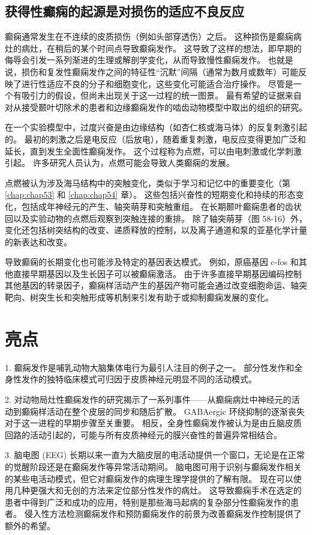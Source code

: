 \subsection{获得性癫痫的起源是对损伤的适应不良反应}
癫痫通常发生在不连续的皮质损伤（例如头部穿透伤）之后。 这种损伤是癫痫病灶的病灶，在稍后的某个时间点导致癫痫发作。 这导致了这样的想法，即早期的侮辱会引发一系列渐进的生理或解剖学变化，从而导致慢性癫痫发作。 也就是说，损伤和复发性癫痫发作之间的特征性“沉默”间隔（通常为数月或数年）可能反映了进行性适应不良的分子和细胞变化，这些变化可能适合治疗操作。 尽管是一个有吸引力的假设，但尚未出现关于这一过程的统一图景。 最有希望的证据来自对从接受颞叶切除术的患者和边缘癫痫发作的啮齿动物模型中取出的组织的研究。

在一个实验模型中，过度兴奋是由边缘结构（如杏仁核或海马体）的反复刺激引起的。 最初的刺激之后是电反应（后放电），随着重复刺激，电反应变得更加广泛和延长，直到发生全面性癫痫发作。 这个过程称为点燃，可以由电刺激或化学刺激引起。 许多研究人员认为，点燃可能会导致人类癫痫的发展。

点燃被认为涉及海马结构中的突触变化，类似于学习和记忆中的重要变化（第 \ref{chap:chap53} 和 \ref{chap:chap54} 章）。 这些包括兴奋性的短期变化和持续的形态变化，包括成年神经元的产生、轴突萌芽和突触重组。 在长期颞叶癫痫患者的齿状回以及实验动物的点燃后观察到突触连接的重排。 除了轴突萌芽（图 58-16）外，变化还包括树突结构的改变、递质释放的控制，以及离子通道和泵的亚基化学计量的新表达和改变。

导致癫痫的长期变化也可能涉及特定的基因表达模式。 例如，原癌基因 c-fos 和其他直接早期基因以及生长因子可以被癫痫激活。 由于许多直接早期基因编码控制其他基因的转录因子，癫痫样活动产生的基因产物可能会通过改变细胞命运、轴突靶向、树突生长和突触形成等机制来引发有助于或抑制癫痫发展的变化。


\section{亮点}

1. 癫痫发作是哺乳动物大脑集体电行为最引人注目的例子之一。 部分性发作和全身性发作的独特临床模式可归因于皮质神经元明显不同的活动模式。 

2. 对动物局灶性癫痫发作的研究揭示了一系列事件——从癫痫病灶中神经元的活动到癫痫样活动在整个皮层的同步和随后扩散。 GABAergic 环绕抑制的逐渐丧失对于这一进程的早期步骤至关重要。 相反，全身性癫痫发作被认为是由丘脑皮质回路的活动引起的，可能与所有皮质神经元的膜兴奋性的普遍异常相结合。 

3. 脑电图 (EEG) 长期以来一直为大脑皮层的电活动提供一个窗口，无论是在正常的觉醒阶段还是在癫痫发作等异常活动期间。 脑电图可用于识别与癫痫发作相关的某些电活动模式，但它对癫痫发作的病理生理学提供的了解有限。 现在可以使用几种更强大和无创的方法来定位部分性发作的病灶。 这导致癫痫手术在选定的患者中得到广泛和成功的应用，特别是那些海马起病的复杂部分性癫痫发作的患者。 侵入性方法检测癫痫发作和预防癫痫发作的前景为改善癫痫发作控制提供了额外的希望。 

